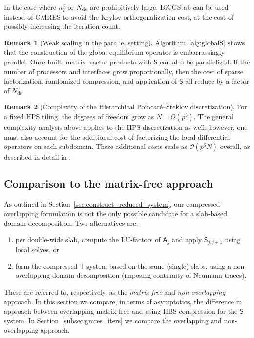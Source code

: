 \documentclass[final,onefignum,onetabnum]{siamart250211}
\newcommand{\mtx}[1]{\bm{\mathsf{#1}}}
\theoremstyle{definition}
\newtheorem{remark}{Remark}
\begin{document}
In the case where $n_2^2$ or $N_{\rm ds}$ are prohibitively large, BiCGStab can be used instead of GMRES to avoid the Krylov orthogonalization cost, at the cost of possibly increasing the iteration count.
\begin{remark}[Weak scaling in the parallel setting]
Algorithm~\ref{alg:globalS} shows that the construction of the global equilibrium operator is embarrassingly parallel.
Once built, matrix–vector products with $\mtx{S}$ can also be parallelized.
If the number of processors and interfaces grow proportionally,
then the cost of sparse factorization, randomized compression,
and application of $\mtx{S}$ all reduce by a factor of $N_{\text{ds}}$.
\label{rem:parallel}
\end{remark}

\begin{remark}[Complexity of the Hierarchical Poincaré–Steklov discretization]
For a fixed HPS tiling, the degrees of freedom grow as
$N = \mathcal{O}(p^3)$.
The general complexity analysis above applies to the HPS discretization as well;
however, one must also account for the additional cost of factorizing the local
differential operators on each subdomain.
These additional costs scale as $\mathcal{O}(p^6 N)$ overall,
as described in detail in \cite{kump2026hps}.
\label{rem:hps_complexity}
\end{remark}
\subsection{Comparison to the matrix-free approach}\label{subsec:compare_to_matfree}
As outlined in Section~\ref{sec:construct_reduced_system}, our compressed overlapping formulation is not the only possible candidate for a slab-based domain decomposition. Two alternatives are:
\begin{enumerate}
    \item per double-wide slab, compute the LU-factors of $\mtx{A}_j$ and apply $\mtx{S}_{j,j\pm 1}$ using local solves, or
    \item form the compressed $\mtx{T}$-system based on the same (single) slabs, using a non-overlapping domain decomposition (imposing continuity of Neumann traces).
\end{enumerate}
These are referred to, respectively, as the \textit{matrix-free} and \textit{non-overlapping} approach. In this section we compare, in terms of asymptotics, the difference in approach between overlapping matrix-free and using HBS compression for the $\mtx{S}$-system. In Section~\ref{subsec:gmres_iters} we compare the overlapping and non-overlapping approach.
\end{document}
